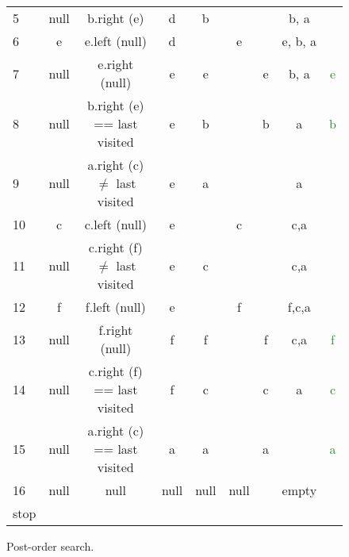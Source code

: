 \begin{figure}[H]
\begin{tabular}{ l|c|c|c|c|c|c|c|c}
5 & \textcolor{BrickRed}{null} & b.right (\textcolor{BrickRed}{e}) & d & b & & & b, a & \\
 
6 & e & e.left (\textcolor{BrickRed}{null}) & d & & e & & e, b, a & \\
 
7 & \textcolor{BrickRed}{null} & e.right (\textcolor{BrickRed}{null}) & e & e & & e & b, a & \textcolor{ForestGreen}{e} \\
 
8 & \textcolor{BrickRed}{null} & b.right (\textcolor{BrickRed}{e}) == last visited & e & b & & b & a & \textcolor{ForestGreen}{b} \\
 
9 & \textcolor{BrickRed}{null} & a.right (\textcolor{BrickRed}{c}) $\neq$ last visited & e & a & & & a & \\
 
10 & c & c.left (\textcolor{BrickRed}{null}) & e &  & c &  & c,a & \\
  
11 & \textcolor{BrickRed}{null} & c.right (\textcolor{BrickRed}{f}) $\neq$ last visited & e & c & & & c,a & \\

12 & f & f.left (\textcolor{BrickRed}{null}) & e & & f & & f,c,a & \\

13 & \textcolor{BrickRed}{null} & f.right (\textcolor{BrickRed}{null}) & f & f & & f & c,a & \textcolor{ForestGreen}{f} \\

14 & \textcolor{BrickRed}{null} & c.right (\textcolor{BrickRed}{f}) == last visited & f & c & & c & a & \textcolor{ForestGreen}{c} \\

15 & \textcolor{BrickRed}{null} & a.right (\textcolor{BrickRed}{c}) == last visited & a & a & & a &  & \textcolor{ForestGreen}{a} \\

16 & \textcolor{BrickRed}{null} & \textcolor{BrickRed}{null} & \textcolor{BrickRed}{null} & \textcolor{BrickRed}{null} & \textcolor{BrickRed}{null} &  & \textcolor{BrickRed}{empty} & \\

\textcolor{BrickRed}{stop} & & &  & & &  &  &  \\
 
\end{tabular}
\caption[Post-order search.]{Post-order search.}
\label{trees_7}
\end{figure}


